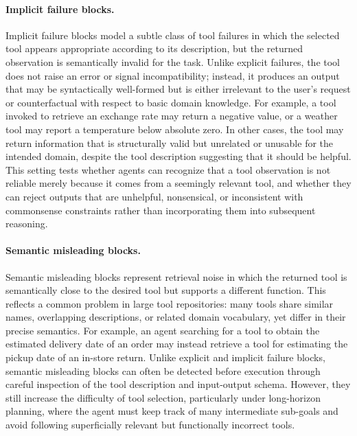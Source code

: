 \documentclass{llmxive}
\begin{document}
\paragraph{Implicit failure blocks.}
Implicit failure blocks model a subtle class of tool failures in which the selected tool appears appropriate according to its description, but the returned observation is semantically invalid for the task. 
Unlike explicit failures, the tool does not raise an error or signal incompatibility; instead, it produces an output that may be syntactically well-formed but is either irrelevant to the user’s request or counterfactual with respect to basic domain knowledge. 
For example, a tool invoked to retrieve an exchange rate may return a negative value, or a weather tool may report a temperature below absolute zero. 
In other cases, the tool may return information that is structurally valid but unrelated or unusable for the intended domain, despite the tool description suggesting that it should be helpful. 
This setting tests whether agents can recognize that a tool observation is not reliable merely because it comes from a seemingly relevant tool, and whether they can reject outputs that are unhelpful, nonsensical, or inconsistent with commonsense constraints rather than incorporating them into subsequent reasoning.

\paragraph{Semantic misleading blocks.}
Semantic misleading blocks represent retrieval noise in which the returned tool is semantically close to the desired tool but supports a different function. This reflects a common problem in large tool repositories: many tools share similar names, overlapping descriptions, or related domain vocabulary, yet differ in their precise semantics. For example, an agent searching for a tool to obtain the estimated delivery date of an order may instead retrieve a tool for estimating the pickup date of an in-store return. Unlike explicit and implicit failure blocks, semantic misleading blocks can often be detected before execution through careful inspection of the tool description and input-output schema. However, they still increase the difficulty of tool selection, particularly under long-horizon planning, where the agent must keep track of many intermediate sub-goals and avoid following superficially relevant but functionally incorrect tools.

\end{document}
